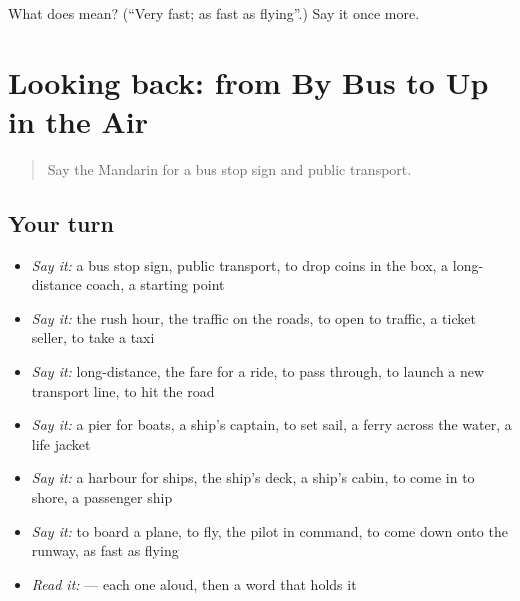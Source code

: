 \begin{tcolorbox}[breakable,colback=teal!4,colframe=teal!35!black,title={Before you move on}]
What does  mean? (\textquotedblleft{}Very fast; as fast as flying\textquotedblright{}.) Say it once more.
\end{tcolorbox}
\section[(dialogue)]{Looking back: from By Bus to Up in the Air}

\label{lesson:ZH-R413-review-408-413}



\begin{quote}
Say the Mandarin for a bus stop sign and public transport.
\end{quote}

\subsection*{Your turn}
\begin{itemize}
\raggedright
  \item \emph{Say it:} a bus stop sign, public transport, to drop coins in the box, a long-distance coach, a starting point
  \item \emph{Say it:} the rush hour, the traffic on the roads, to open to traffic, a ticket seller, to take a taxi
  \item \emph{Say it:} long-distance, the fare for a ride, to pass through, to launch a new transport line, to hit the road
  \item \emph{Say it:} a pier for boats, a ship's captain, to set sail, a ferry across the water, a life jacket
  \item \emph{Say it:} a harbour for ships, the ship's deck, a ship's cabin, to come in to shore, a passenger ship
  \item \emph{Say it:} to board a plane, to fly, the pilot in command, to come down onto the runway, as fast as flying
  \item \emph{Read it:}     — each one aloud, then a word that holds it
\end{itemize}

